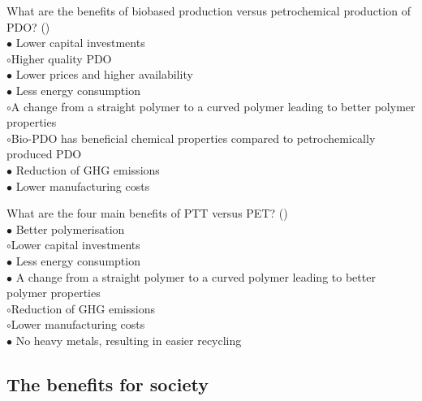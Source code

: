 \documentclass[]{beamer}
\begin{document}
\begin{CJK}{UTF8}{gbsn}
\begin{frame}[shrink] {} 
\addtocounter{questions}{1}
\color{blue}
  What are the benefits of biobased production versus petrochemical production of PDO?
 ({})\\
\color{black}
\setlength{\parindent}{-0.4cm}
{\color{red}$\bullet$} Lower capital investments  \\
{\color{red}$\circ$}Higher quality PDO   \\
{\color{red}$\bullet$} Lower prices and higher availability  \\
{\color{red}$\bullet$} Less energy consumption  \\
{\color{red}$\circ$}A change from a straight polymer to a curved polymer leading to better polymer properties  \\
{\color{red}$\circ$}Bio-PDO has beneficial chemical properties compared to petrochemically produced PDO  \\
{\color{red}$\bullet$} Reduction of GHG emissions  \\
{\color{red}$\bullet$} Lower manufacturing costs  \\
\end{frame}


\begin{frame}[shrink] {} 
\addtocounter{questions}{1}
\color{blue}
  What are the four main benefits of PTT versus PET?
 ({})\\
\color{black}
\setlength{\parindent}{-0.4cm}
{\color{red}$\bullet$} Better polymerisation   \\
{\color{red}$\circ$}Lower capital investments  \\
{\color{red}$\bullet$} Less energy consumption  \\
{\color{red}$\bullet$} A change from a straight polymer to a curved polymer leading to better polymer properties  \\
{\color{red}$\circ$}Reduction of GHG emissions  \\
{\color{red}$\circ$}Lower manufacturing costs  \\
{\color{red}$\bullet$} No heavy metals, resulting in easier recycling  \\

\end{frame}


\subsection{The benefits for society}
\setcounter{questions}{0}



\end{CJK}
\end{document}
